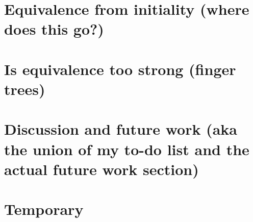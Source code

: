 \documentclass{article}
\begin{document}
\section{Equivalence from initiality (where does this go?)}\label{sec:initiality}



\section{Is equivalence too strong (finger trees)}\label{sec:weakening}



\section{Discussion and future work (aka the union of my to-do list and the actual future work section)}\label{sec:discussion}



\section{Temporary}\label{sec:temp}
\listoftodos
%


\printbibliography
\end{document}
